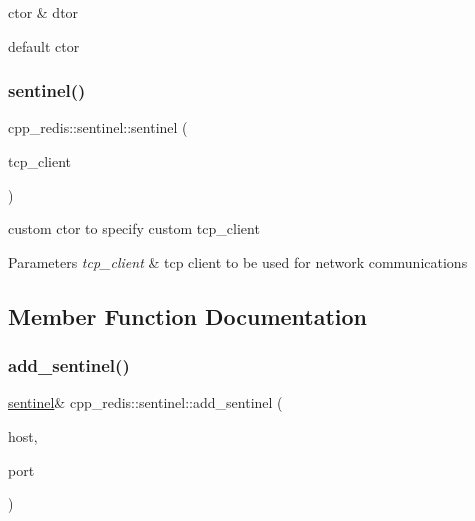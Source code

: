 ctor \& dtor 

default ctor \mbox{\label{classcpp__redis_1_1sentinel_af53665f5834dfe5861a6310318ae5169}} 
\subsubsection{\texorpdfstring{sentinel()}{sentinel()}\hspace{0.1cm}{\footnotesize\ttfamily [2/2]}}
{\footnotesize\ttfamily cpp\+\_\+redis\+::sentinel\+::sentinel (\begin{DoxyParamCaption}\item[{const std\+::shared\+\_\+ptr$<$ \hyperlink{classcpp__redis_1_1network_1_1tcp__client__iface}{network\+::tcp\+\_\+client\+\_\+iface} $>$ \&}]{tcp\+\_\+client }\end{DoxyParamCaption})\hspace{0.3cm}{\ttfamily [explicit]}}

custom ctor to specify custom tcp\+\_\+client


\begin{DoxyParams}{Parameters}
{\em tcp\+\_\+client} & tcp client to be used for network communications \\
\hline
\end{DoxyParams}


\subsection{Member Function Documentation}
\mbox{\label{classcpp__redis_1_1sentinel_a548dad45711dc2e7da7e0803d5a74a2e}} 
\subsubsection{\texorpdfstring{add\+\_\+sentinel()}{add\_sentinel()}}
{\footnotesize\ttfamily \hyperlink{classcpp__redis_1_1sentinel}{sentinel}\& cpp\+\_\+redis\+::sentinel\+::add\+\_\+sentinel (\begin{DoxyParamCaption}\item[{const std\+::string \&}]{host,  }\item[{std\+::size\+\_\+t}]{port }\end{DoxyParamCaption})}

